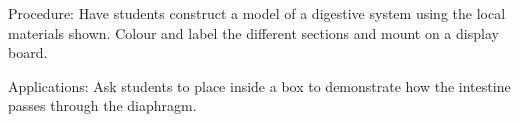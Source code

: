 \begin{multicols}{2}
\begin{description*}
\item[Procedure:]{Have students construct a model of a digestive system using the local materials shown. Colour and label the different sections and mount on a display board. }
\item[Applications:]{Ask students to place inside a box to demonstrate how the intestine passes through the diaphragm.}
\end{description*}

%
%


\end{multicols}
